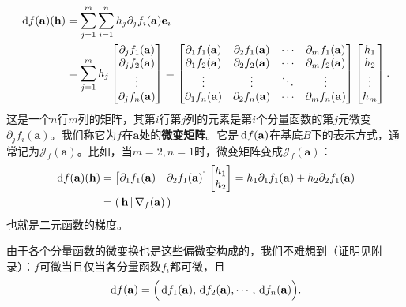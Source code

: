 \documentclass[12pt,UTF8,fontset=none]{ctexbook}
\begin{document}
\begin{align*}
    \,\mathrm{d} f (\mathbf{a})(\mathbf{h}) &= \sum_{j=1}^m \sum_{i=1}^n h_j\partial_{j} f_i(\mathbf{a})\mathbf{e}_i \\
  &= \sum_{j=1}^m h_j\begin{bmatrix}
    \partial_{j} f_1(\mathbf{a}) \\ \partial_{j} f_2(\mathbf{a}) \\ \vdots \\ \partial_{j} f_n(\mathbf{a})
\end{bmatrix} = \begin{bmatrix}
    \partial_{1} f_1(\mathbf{a}) & \partial_{2} f_1(\mathbf{a}) & \cdots & \partial_{m} f_1(\mathbf{a}) \\
    \partial_{1} f_2(\mathbf{a}) & \partial_{2} f_2(\mathbf{a}) & \cdots & \partial_{m} f_2(\mathbf{a}) \\
    \vdots & \vdots & \ddots & \vdots \\
    \partial_{1} f_n(\mathbf{a}) & \partial_{2} f_n(\mathbf{a}) & \cdots & \partial_{m} f_n(\mathbf{a})
\end{bmatrix} \begin{bmatrix}
    h_1 \\ h_2 \\ \vdots \\ h_m
\end{bmatrix}.
\end{align*}
这是一个$n$行$m$列的矩阵，其第$i$行第$j$列的元素是第$i$个分量函数的第$j$元微变$\partial_{j} f_i(\mathbf{a})$。我们称它为$f$在$\mathbf{a}$处的\textbf{微变矩阵}。它是$\,\mathrm{d} f (\mathbf{a})$在基底$B$下的表示方式，通常记为$\mathcal{J}_f(\mathbf{a})$。比如，当$m=2,n=1$时，微变矩阵变成$\mathcal{J}_f(\mathbf{a})$：
\begin{align*}
    \,\mathrm{d} f (\mathbf{a})(\mathbf{h}) &= \begin{bmatrix}
        \partial_{1} f_1(\mathbf{a}) & \partial_{2} f_1(\mathbf{a})
    \end{bmatrix} \begin{bmatrix}
        h_1 \\h_2
    \end{bmatrix} = h_1 \partial_{1} f_1(\mathbf{a}) + h_2 \partial_{2} f_1(\mathbf{a})\\
    &= \displaystyle\left( \,\mathbf{h} \,\middle\vert \,\nabla_f(\mathbf{a}) \,\right)
\end{align*}
也就是二元函数的梯度。

由于各个分量函数的微变换也是这些偏微变构成的，我们不难想到（证明见附录）：$f$可微当且仅当各分量函数$f_i$都可微，且
$$\,\mathrm{d} f (\mathbf{a}) = \Big(\,\mathrm{d} f_1 (\mathbf{a}), \,\mathrm{d} f_2 (\mathbf{a}), \cdots, \,\mathrm{d} f_n (\mathbf{a})\Big).$$
\end{document}

